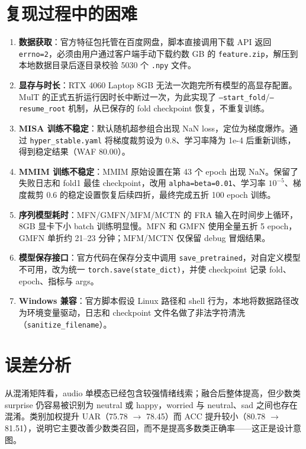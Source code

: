 ﻿\documentclass[a4paper,11pt]{ctexart}
\begin{document}
\section{复现过程中的困难}

\begin{enumerate}
  \item \textbf{数据获取}：官方特征包托管在百度网盘，脚本直接调用下载 API 返回 \texttt{errno=2}，必须由用户通过客户端手动下载约数 GB 的 \texttt{feature.zip}，解压到本地数据目录后逐目录校验 5030 个 \texttt{.npy} 文件。
  \item \textbf{显存与时长}：RTX 4060 Laptop 8GB 无法一次跑完所有模型的高显存配置。MulT 的正式五折运行因时长中断过一次，为此实现了 \texttt{--start\_fold}/\texttt{--resume\_root} 机制，从已保存的 fold checkpoint 恢复，不重复训练。
  \item \textbf{MISA 训练不稳定}：默认随机超参组合出现 NaN loss，定位为梯度爆炸。通过 \texttt{hyper\_stable.yaml} 将梯度裁剪设为 0.8、学习率降为 1e-4 后重新训练，得到稳定结果（WAF 80.00）。
  \item \textbf{MMIM 训练不稳定}：MMIM 原始设置在第 43 个 epoch 出现 NaN。保留了失败日志和 fold1 最佳 checkpoint，改用 \texttt{alpha=beta=0.01}、学习率 $10^{-5}$、梯度裁剪 0.6 的稳定设置恢复后续四折，最终完成五折 100 epoch 训练。
  \item \textbf{序列模型耗时}：MFN/GMFN/MFM/MCTN 的 FRA 输入在时间步上循环，8GB 显卡下小 batch 训练明显慢。MFN 和 GMFN 使用全量五折 5 epoch，GMFN 单折约 21--23 分钟；MFM/MCTN 仅保留 debug 冒烟结果。
  \item \textbf{模型保存接口}：官方代码在保存分支中调用 \texttt{save\_pretrained}，对自定义模型不可用，改为统一 \texttt{torch.save(state\_dict)}，并使 checkpoint 记录 fold、epoch、指标与 args。
  \item \textbf{Windows 兼容}：官方脚本假设 Linux 路径和 shell 行为，本地将数据路径改为环境变量驱动，日志和 checkpoint 文件名做了非法字符清洗（\texttt{sanitize\_filename}）。
\end{enumerate}

\section{误差分析}

从混淆矩阵看，audio 单模态已经包含较强情绪线索；融合后整体提高，但少数类 surprise 仍容易被识别为 neutral 或 happy，worried 与 neutral、sad 之间也存在混淆。类别加权提升 UAR（75.78 $\to$ 78.45）而 ACC 提升较小（80.78 $\to$ 81.51），说明它主要改善少数类召回，而不是提高多数类正确率——这正是设计意图。
\end{document}
